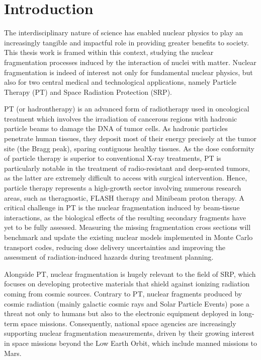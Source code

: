 \cleardoublepage
\chapter*{Introduction}\label{ch:introduction}
The interdisciplinary nature of science has enabled nuclear physics to play an increasingly tangible and impactful role in providing greater benefits to society. This thesis work is framed within this context, studying the nuclear fragmentation processes induced by the interaction of nuclei with matter. Nuclear fragmentation is indeed of interest not only for fundamental nuclear physics, but also for two central medical and technological applications, namely Particle Therapy (PT) and Space Radiation Protection (SRP).

PT (or hadrontherapy) is an advanced form of radiotherapy used in oncological treatment which involves the irradiation of cancerous regions with hadronic particle beams to damage the DNA of tumor cells. As hadronic particles penetrate human tissues, they deposit most of their energy precisely at the tumor site (the Bragg peak), sparing contiguous healthy tissues. As the dose conformity of particle therapy is superior to conventional X-ray treatments, PT is particularly notable in the treatment of radio-resistant and deep-seated tumors, as the latter are extremely difficult to access with surgical intervention. Hence, particle therapy represents a high-growth sector involving numerous research areas, such as theragnostic, FLASH therapy and Minibeam proton therapy. A critical challenge in PT is the nuclear fragmentation induced by beam-tissue interactions, as the biological effects of the resulting secondary fragments have yet to be fully assessed. Measuring the missing fragmentation cross sections will benchmark and update the existing nuclear models implemented in Monte Carlo transport codes, reducing dose delivery uncertainties and improving the assessment of radiation-induced hazards during treatment planning.

Alongside PT, nuclear fragmentation is hugely relevant to the field of SRP, which focuses on developing protective materials that shield against ionizing radiation coming from cosmic sources. Contrary to PT, nuclear fragments produced by cosmic radiation (mainly galactic cosmic rays and Solar Particle Events) pose a threat not only to humans but also to the electronic equipment deployed in long-term space missions. Consequently, national space agencies are increasingly supporting nuclear fragmentation measurements, driven by their growing interest in space missions beyond the Low Earth Orbit, which include manned missions to Mars.

